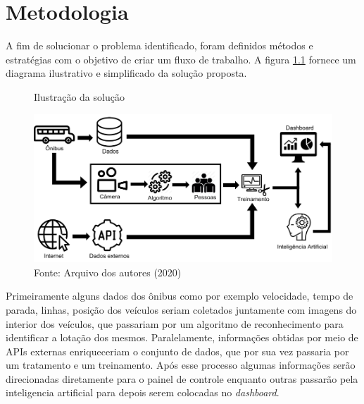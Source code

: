 \chapter{Metodologia}
\label{Cap:MateriaisMetodos}

\indent
\par A fim de solucionar o problema identificado, foram definidos métodos e estratégias com o objetivo de criar um fluxo de trabalho. A figura \ref{DiagramaDeBlocosIcones} fornece um diagrama ilustrativo e simplificado da solução proposta.

\begin{figure}[H]
    \centering
    \caption{Ilustração da solução}
    \includegraphics[width=1.0\linewidth]{Imagens/DiagramaDeBlocosIcones.png}
    \caption*{Fonte: Arquivo dos autores (2020)}
    \label{DiagramaDeBlocosIcones}
\end{figure}

\indent
\par Primeiramente alguns dados dos ônibus como por exemplo velocidade, tempo de parada, linhas, posição dos veículos seriam coletados juntamente com imagens do interior dos veículos, que passariam por um algoritmo de reconhecimento para identificar a lotação dos mesmos. Paralelamente, informações obtidas por meio de APIs externas enriqueceriam o conjunto de dados, que por sua vez passaria por um tratamento e um treinamento. Após esse processo algumas informações serão direcionadas diretamente para o painel de controle enquanto outras passarão pela inteligencia artificial para depois serem colocadas no \textit{dashboard}.

